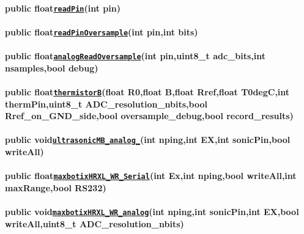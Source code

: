 \paragraph*{{\ttfamily public float}\href{#classLogger_1a343fcabefb37e06429865a2e6a6e708a}{\tt {\ttfamily read\+Pin}}{\ttfamily (int pin)}}

\paragraph*{{\ttfamily public float}\href{#classLogger_1a4e67526c65fa865f276a515a200af4aa}{\tt {\ttfamily read\+Pin\+Oversample}}{\ttfamily (int pin,int bits)}}

\paragraph*{{\ttfamily public float}\href{#classLogger_1ad8296890a14a0df83c2433a20f25b899}{\tt {\ttfamily analog\+Read\+Oversample}}{\ttfamily (int pin,uint8\+\_\+t adc\+\_\+bits,int nsamples,bool debug)}}

\paragraph*{{\ttfamily public float}\href{#classLogger_1a55d923b98a6c503fccb25bfd4af32f3d}{\tt {\ttfamily thermistorB}}{\ttfamily (float R0,float B,float Rref,float T0degC,int therm\+Pin,uint8\+\_\+t A\+D\+C\+\_\+resolution\+\_\+nbits,bool Rref\+\_\+on\+\_\+\+G\+N\+D\+\_\+side,bool oversample\+\_\+debug,bool record\+\_\+results)}}

\paragraph*{{\ttfamily public void}\href{#classLogger_1a362a1462166d63ddc613eaa1e86f9854}{\tt {\ttfamily ultrasonic\+M\+B\+\_\+analog\+\_\+1cm}}{\ttfamily (int nping,int EX,int sonic\+Pin,bool write\+All)}}

\paragraph*{{\ttfamily public float}\href{#classLogger_1a87ce56cb9c3dfc7abfd6308b2ee7dc10}{\tt {\ttfamily maxbotix\+H\+R\+X\+L\+\_\+\+W\+R\+\_\+\+Serial}}{\ttfamily (int Ex,int nping,bool write\+All,int max\+Range,bool R\+S232)}}

\paragraph*{{\ttfamily public void}\href{#classLogger_1a3ce2869bbd48fdebbf44e155981c85b0}{\tt {\ttfamily maxbotix\+H\+R\+X\+L\+\_\+\+W\+R\+\_\+analog}}{\ttfamily (int nping,int sonic\+Pin,int EX,bool write\+All,uint8\+\_\+t A\+D\+C\+\_\+resolution\+\_\+nbits)}}

